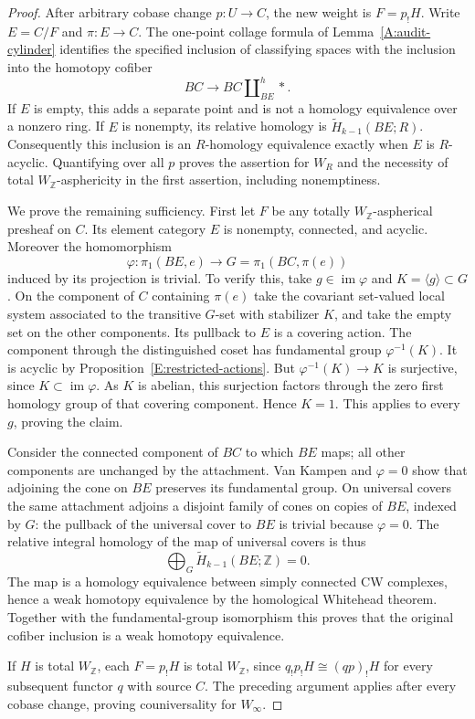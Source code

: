 \begin{proof}
After arbitrary cobase change $p:U\to C$, the
new weight is $F=p_!H$. Write $E=C/F$ and
$\pi:E\to C$. The one-point collage formula
of Lemma~\ref{A:audit-cylinder} identifies
the specified inclusion of classifying spaces
with the inclusion into the homotopy cofiber
\[
 BC\longrightarrow
 BC\amalg^h_{BE}*.
\]
If $E$ is empty, this adds a separate point
and is not a homology equivalence over a
nonzero ring. If $E$ is nonempty, its relative
homology is $\widetilde H_{k-1}(BE;R)$.
Consequently this inclusion is an $R$-homology
equivalence exactly when $E$ is $R$-acyclic.
Quantifying over all $p$ proves the assertion
for $W_R$ and the necessity of total
$W_{\mathbb Z}$-asphericity in the first
assertion, including nonemptiness.

We prove the remaining sufficiency. First let
$F$ be any totally $W_{\mathbb Z}$-aspherical
presheaf on $C$. Its element category $E$
is nonempty, connected, and acyclic. Moreover
the homomorphism
\[
 \varphi:\pi_1(BE,e)\longrightarrow
 G=\pi_1(BC,\pi(e))
\]
induced by its projection is trivial. To
verify this, take $g\in\operatorname{im}\varphi$
and $K=\langle g\rangle\subset G$. On the
component of $C$ containing $\pi(e)$ take
the covariant set-valued local system
associated to the transitive $G$-set with
stabilizer $K$, and take the empty set on
the other components. Its pullback to $E$
is a covering action. The component through
the distinguished coset has fundamental
group $\varphi^{-1}(K)$. It is acyclic by
Proposition~\ref{E:restricted-actions}.
But $\varphi^{-1}(K)\to K$ is surjective,
since $K\subset\operatorname{im}\varphi$.
As $K$ is abelian, this surjection factors
through the zero first homology group of
that covering component. Hence $K=1$.
This applies to every $g$, proving the claim.

Consider the connected component of $BC$
to which $BE$ maps; all other components
are unchanged by the attachment. Van Kampen
and $\varphi=0$ show that adjoining the
cone on $BE$ preserves its fundamental
group. On universal covers the same
attachment adjoins a disjoint family of
cones on copies of $BE$, indexed by $G$:
the pullback of the universal cover to
$BE$ is trivial because $\varphi=0$.
The relative integral homology of the
map of universal covers is thus
\[
 \bigoplus_{G}\widetilde H_{k-1}(BE;\mathbb Z)=0.
\]
The map is a homology equivalence between
simply connected CW complexes, hence a
weak homotopy equivalence by the homological
Whitehead theorem. Together with the
fundamental-group isomorphism this proves
that the original cofiber inclusion is a
weak homotopy equivalence.

If $H$ is total $W_{\mathbb Z}$, each
$F=p_!H$ is total $W_{\mathbb Z}$, since
$q_!p_!H\cong(qp)_!H$ for every subsequent
functor $q$ with source $C$. The
preceding argument applies after every
cobase change, proving couniversality
for $W_\infty$.
\end{proof}

